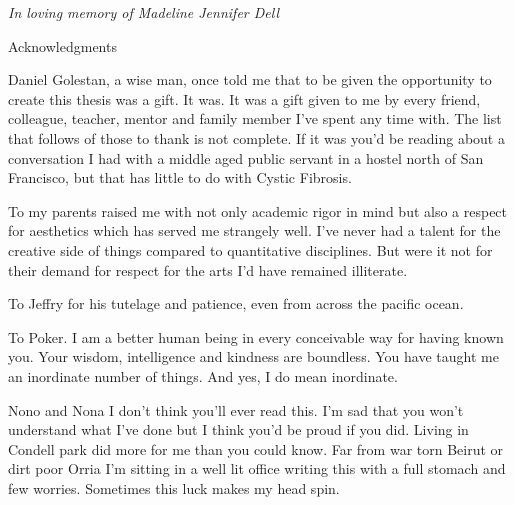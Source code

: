 \newpage


\thispagestyle{empty}


\begin{center}
	\vspace*{\fill}
\textit {In loving memory of Madeline Jennifer Dell} \\
	\vspace*{\fill}
\end{center}

\clearpage

\begin{center}
\begin{Large}
\begin{bfseries}
Acknowledgments
\end{bfseries}
\end{Large}
\end{center}
 Daniel Golestan, a wise man, once told me that to be given the opportunity to create this thesis was a gift. It was. It was a gift given to me by every friend, colleague, teacher, mentor and family member I've spent any time with. The list that follows of those to thank is not complete. If it was you'd be reading about a conversation I had with a middle aged public servant in a hostel north of San Francisco, but that has little to do with Cystic Fibrosis. 

To my parents raised me with not only academic rigor in mind but also a respect for aesthetics which has served me strangely well. I've never had a talent for the creative side of things compared to quantitative disciplines. But were it not for their demand for respect for the arts I'd have remained illiterate. 

To Jeffry for his tutelage and patience, even from across the pacific ocean. 

To Poker. I am a better human being in every conceivable way for having known you. Your wisdom, intelligence and kindness are boundless. You have taught me an inordinate number of things. And yes, I do mean inordinate. 

Nono and Nona I don't think you'll ever read this. I'm sad that you won't understand what I've done but I think you'd be proud if you did. Living in Condell park did more for me than you could know. Far from war torn Beirut or dirt poor Orria I'm sitting in a well lit office writing this with a full stomach and few worries. Sometimes this luck makes my head spin. 

